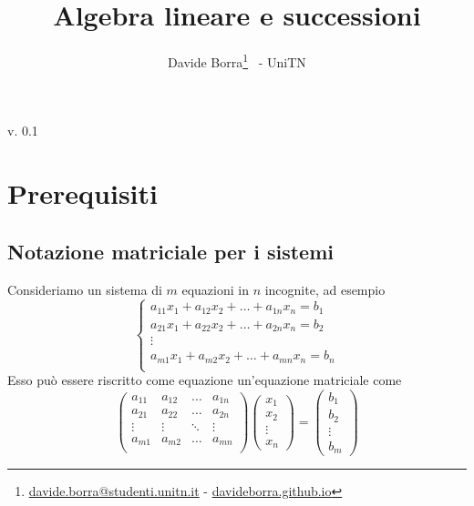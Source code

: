 \documentclass{article}     %
\title{Algebra lineare e successioni\\\textit{\small\say{Prevedere il futuro equivale a fare potenze di matrici}}}
\author{Davide Borra\footnote{\href{mailto:davide.borra@studenti.unitn.it}{davide.borra@studenti.unitn.it} - \url{davideborra.github.io}} ~- UniTN}
\begin{document}
\begin{titlepage}
    \maketitle
    \tableofcontents
    \vspace{\fill}
    \hspace{\fill} v. 0.1   %
\end{titlepage}

\chead{}

\section{Prerequisiti}
\subsection{Notazione matriciale per i sistemi}
Consideriamo un sistema di $m$ equazioni in $n$ incognite, ad esempio
\[\begin{cases} 
    a_{11}x_1 + a_{12}x_2 +\dots + a_{1n}x_n = b_1\\
    a_{21}x_1 + a_{22}x_2 +\dots + a_{2n}x_n = b_2\\
    \vdots\\
    a_{m1}x_1 + a_{m2}x_2 +\dots + a_{mn}x_n = b_n\\
 \end{cases} \]
Esso può essere riscritto come equazione un'equazione matriciale come 
\[\begin{pmatrix} 
    a_{11}& a_{12}&\dots&a_{1n}\\
    a_{21}& a_{22}&\dots&a_{2n}\\
    \vdots & \vdots & \ddots& \vdots\\
    a_{m1}& a_{m2}&\dots&a_{mn}\\
\end{pmatrix} 
\begin{pmatrix} x_1 \\ x_2 \\ \vdots \\ x_n\end{pmatrix} = \begin{pmatrix} b_1 \\ b_2 \\ \vdots \\ b_m\end{pmatrix} 
\]
\end{document}
